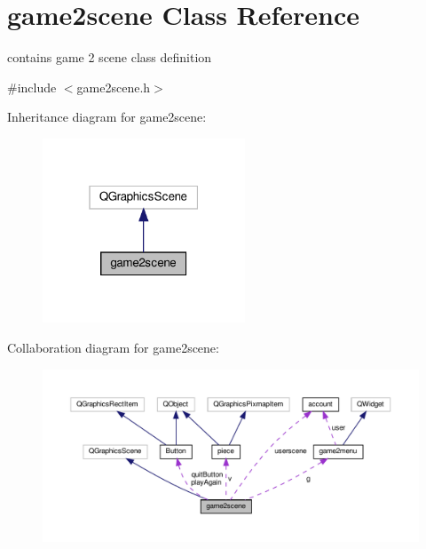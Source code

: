 \hypertarget{classgame2scene}{}\section{game2scene Class Reference}
\label{classgame2scene}


contains game 2 scene class definition  




{\ttfamily \#include $<$game2scene.\+h$>$}



Inheritance diagram for game2scene\+:\nopagebreak
\begin{figure}[H]
\begin{center}
\leavevmode
\includegraphics[width=171pt]{classgame2scene__inherit__graph}
\end{center}
\end{figure}


Collaboration diagram for game2scene\+:\nopagebreak
\begin{figure}[H]
\begin{center}
\leavevmode
\includegraphics[width=350pt]{classgame2scene__coll__graph}
\end{center}
\end{figure}
